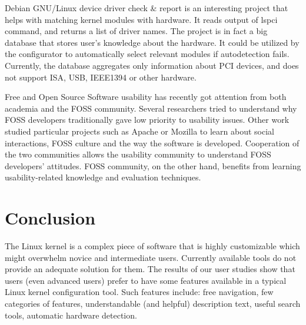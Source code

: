 \documentclass{chi2009}
\begin{document}
Debian GNU/Linux device driver check \& report \cite{muto:check:2010} is an interesting project that helps with matching kernel modules with hardware. It reads
output of \textsf{lspci} command, and returns a list of driver names. The project is in fact a big database that stores user's knowledge about the hardware. It
could be utilized by the configurator to automatically select relevant modules if autodetection fails. Currently, the database aggregates only information about
PCI devices, and does not support ISA, USB, IEEE1394 or other hardware.

Free and Open Source Software usability has recently got attention from both academia and the FOSS community. Several researchers
\cite{nichols:usability:2003, andreasen:usability:2006} tried to understand why FOSS developers traditionally gave low priority to usability issues. Other work
studied particular projects such as Apache \cite{mockus:apache:2000} or Mozilla \cite{mockus:mozilla:2002} to learn about social interactions, FOSS culture and
the way the software is developed. Cooperation of the two communities allows the usability community to understand FOSS developers' attitudes. FOSS community,
on the other hand, benefits from learning usability-related knowledge and evaluation techniques.

\section{Conclusion}\label{sec:conclusion}
The Linux kernel is a complex piece of software that is highly customizable which might overwhelm novice and intermediate users. Currently available tools do
not provide an adequate solution for them. The results of our user studies show that users (even advanced users) prefer to have some features available in a
typical Linux kernel configuration tool. Such features include: free navigation, few categories of features, understandable (and helpful) description text,
useful search tools, automatic hardware detection.



\end{document}
